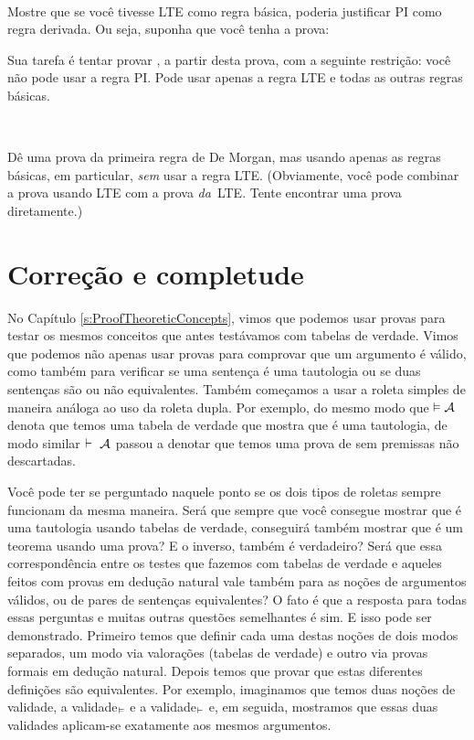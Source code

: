 \

\problempart
Mostre que se você tivesse LTE como regra básica, poderia justificar PI  como regra derivada. Ou seja, suponha que você tenha a prova:
\begin{fitchproof}
  \open
  \close
\end{fitchproof}
Sua tarefa é tentar provar , a partir desta prova, com a seguinte restrição: você não pode usar a regra PI. Pode usar apenas a regra LTE e todas as outras regras básicas.

\

\problempart
Dê uma prova da primeira regra de De Morgan, mas usando apenas as regras básicas, em particular,  \emph{sem} usar a regra LTE. (Obviamente, você pode combinar a prova usando LTE com a prova  \emph{da}~LTE. Tente encontrar uma prova diretamente.)


 

\chapter{Correção e completude}
\label{sec:soundness_and_completeness}

 
No Capítulo \ref{s:ProofTheoreticConcepts}, vimos que podemos usar provas para testar os mesmos conceitos que antes testávamos com tabelas de verdade. Vimos que podemos não apenas usar provas para comprovar que um argumento é válido, como também para verificar se uma sentença é uma tautologia ou se duas sentenças são ou não equivalentes. Também começamos a usar a roleta simples de maneira análoga ao uso da roleta dupla. Por exemplo, do mesmo modo que  $\vDash \mathcal{A}$ denota que temos uma tabela de verdade que mostra que  é uma tautologia, de modo similar $\vdash$~$\mathcal{A}$ passou a denotar que temos uma prova de  sem premissas não descartadas.

Você pode ter se perguntado naquele ponto se os dois tipos de roletas sempre funcionam da mesma maneira. Será que sempre que você consegue mostrar que  é uma tautologia usando tabelas de verdade, conseguirá também mostrar que  é um teorema usando uma prova? E o inverso, também é verdadeiro? Será que essa correspondência entre os testes que fazemos com tabelas de verdade e aqueles feitos com provas em dedução natural vale também para as noções de argumentos válidos, ou de pares de sentenças equivalentes? O fato é que a resposta para todas essas perguntas e muitas outras questões semelhantes é sim. E isso pode ser demonstrado. Primeiro temos que definir cada uma destas noções de dois modos separados, um modo via valorações (tabelas de verdade) e outro via provas formais em dedução natural. Depois temos que provar que estas diferentes definições são equivalentes. Por exemplo, imaginamos que temos duas noções de validade, a validade$_{\vDash}$ e a validade$_{\vdash}$ e, em seguida, mostramos que essas duas validades aplicam-se exatamente aos mesmos argumentos.

